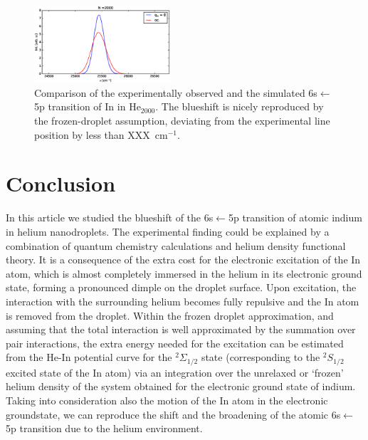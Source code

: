 \documentclass[twoside,twocolumn,9pt]{article}
\begin{document}
\begin{figure}[htbp!]
  	\begin{center}
 		\includegraphics[width=0.45\textwidth]{7.eps}
                \caption{Comparison of the experimentally observed and the simulated 6s$\leftarrow{}$5p transition of In in He$_{2000}$. The blueshift is nicely reproduced by the frozen-droplet assumption, deviating from the experimental line position by less than XXX~cm$^{-1}$. \label{pic:final}}
  	\end{center}
\end{figure}

\section{Conclusion}
In this article we studied the blueshift of the 6s$\leftarrow{}$5p transition of atomic indium in helium nanodroplets. The experimental finding could be explained by a combination of quantum chemistry calculations and helium density functional theory. It is a consequence of the extra cost for the electronic excitation of the In atom, which is almost completely immersed in the helium in its electronic ground state, forming a pronounced dimple on the droplet surface. Upon excitation, the interaction with the surrounding helium becomes fully repulsive and the In atom is removed from the droplet. Within the frozen droplet approximation, and assuming that the total interaction is well approximated by the summation over pair interactions, the extra energy needed for the excitation can be estimated from the He-In potential curve for the  $^2\Sigma_{1/2}$ state (corresponding to the $^2S_{1/2}$ excited state of the In atom) via an integration over the unrelaxed or `frozen' helium density of the system obtained for the electronic ground state of indium. Taking into consideration also the motion of the In atom in the electronic groundstate, we can reproduce the shift and the broadening of the atomic 6s$\leftarrow{}$5p transition due to the helium environment.


\end{document}
